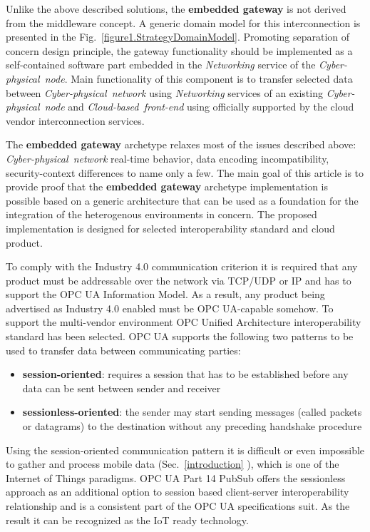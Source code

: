 \documentclass{jacsart}
\providecommand{\tightlist} { \setlength{\itemsep}{0pt}\setlength{\parskip}{0pt}}
\begin{document}
Unlike the above described solutions, the \textbf{embedded gateway} is not derived from the middleware concept. A generic domain model for this interconnection is presented in the Fig.~\ref*{figure1.StrategyDomainModel}. Promoting separation of concern design principle, the gateway functionality should be implemented as a self-contained software part embedded in the \textit{Networking} service of the \textit{Cyber-physical\ node}. Main functionality of this component is to transfer selected data between \textit{Cyber-physical\ network} using \textit{Networking} services of an existing \textit{Cyber-physical\ node} and \textit{Cloud-based\ front-end} using officially supported by the cloud vendor interconnection services.

The \textbf{embedded gateway} archetype relaxes most of the issues described above: \textit{Cyber-physical\ network} real-time behavior, data encoding incompatibility, security-context differences to name only a few. The main goal of this article is to provide proof that the \textbf{embedded gateway} archetype implementation is possible based on a generic architecture that can be used as a foundation for the integration of the heterogenous environments in concern. The proposed implementation is designed for selected interoperability standard and cloud product.

To comply with the Industry 4.0 communication criterion it is required that any product must be addressable over the network via TCP/UDP or IP and has to support the OPC UA Information Model. As a result, any product being advertised as Industry 4.0 enabled must be OPC UA-capable somehow. To support the multi-vendor environment OPC Unified Architecture interoperability standard has been selected. OPC UA supports the following two patterns to be used to transfer data between communicating parties:

\begin{itemize}
      \tightlist
      \item \textbf{session-oriented}: requires a session that has to be established before any data can be sent between sender and receiver
      \item \textbf{sessionless-oriented}: the sender may start sending messages (called packets or datagrams) to the destination without any preceding handshake procedure
\end{itemize}

Using the session-oriented communication pattern it is difficult or even impossible to gather and process mobile data (Sec.~\ref*{introduction} ), which is one of the Internet of Things paradigms. OPC UA Part 14 PubSub \cite{RefWorks:doc:5d98837de4b055984c0eecf0}  offers the sessionless approach as an additional option to session based client-server interoperability relationship and is a consistent part of the OPC UA specifications suit. As the result it can be recognized as the IoT ready technology.
\end{document}
